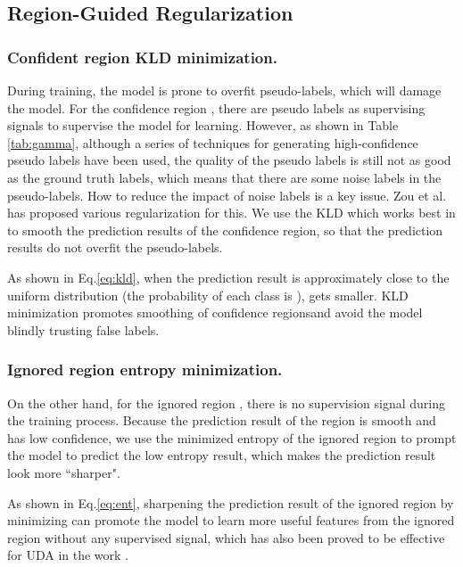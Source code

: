 \documentclass[runningheads]{llncs}
\begin{document}
\subsection{Region-Guided Regularization} \label{subsection: r}
\subsubsection{Confident region KLD minimization.} During training, the model is prone to overfit pseudo-labels, which will damage the model. For the confidence region , there are pseudo labels as supervising signals to supervise the model for learning. However, as shown in Table \ref{tab:gamma}, although a series of techniques for generating high-confidence pseudo labels have been used, the quality of the pseudo labels is still not as good as the ground truth labels, which means that there are some noise labels in the pseudo-labels. How to reduce the impact of noise labels is a key issue. Zou et al.  \cite{zou2019confidence} has proposed various regularization for this. We use the KLD which works best in \cite{zou2019confidence} to smooth the prediction results of the confidence region, so that the prediction results do not overfit the pseudo-labels. 




As shown in Eq.\eqref{eq:kld}, when the prediction result  is approximately close to the uniform distribution (the probability of each class is ),  gets smaller. KLD minimization promotes smoothing of confidence regionsand avoid the model blindly trusting false labels.

\subsubsection{Ignored region entropy minimization.}On the other hand, for the ignored region , there is no supervision signal during the training process. Because the prediction result of the region  is smooth and has low confidence, we use the minimized entropy of the ignored region to prompt the model to predict the low entropy result, which makes the prediction result look more ``sharper".



As shown in Eq.\eqref{eq:ent}, sharpening the prediction result of the ignored region by minimizing  can promote the model to learn more useful features from the ignored region without any supervised signal, which has also been proved to be effective for UDA in the work \cite{vu2019advent}.
\end{document}
